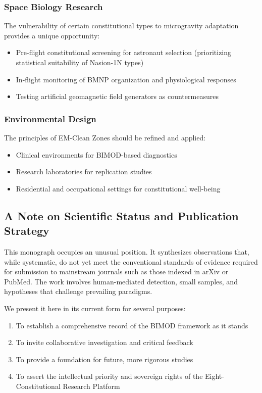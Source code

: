 \documentclass[12pt,a4paper]{article}
\begin{document}
\subsubsection{Space Biology Research}

The vulnerability of certain constitutional types to microgravity adaptation provides a unique opportunity:

\begin{itemize}
    \item Pre-flight constitutional screening for astronaut selection (prioritizing statistical suitability of Nasion-1N types)
    \item In-flight monitoring of BMNP organization and physiological responses
    \item Testing artificial geomagnetic field generators as countermeasures
\end{itemize}

\subsubsection{Environmental Design}

The principles of EM-Clean Zones should be refined and applied:

\begin{itemize}
    \item Clinical environments for BIMOD-based diagnostics
    \item Research laboratories for replication studies
    \item Residential and occupational settings for constitutional well-being
\end{itemize}

\subsection{A Note on Scientific Status and Publication Strategy}

This monograph occupies an unusual position. It synthesizes observations that, while systematic, do not yet meet the conventional standards of evidence required for submission to mainstream journals such as those indexed in arXiv or PubMed. The work involves human-mediated detection, small samples, and hypotheses that challenge prevailing paradigms.

We present it here in its current form for several purposes:

\begin{enumerate}
    \item To establish a comprehensive record of the BIMOD framework as it stands
    \item To invite collaborative investigation and critical feedback
    \item To provide a foundation for future, more rigorous studies
    \item To assert the intellectual priority and sovereign rights of the Eight-Constitutional Research Platform
\end{enumerate}
\end{document}
